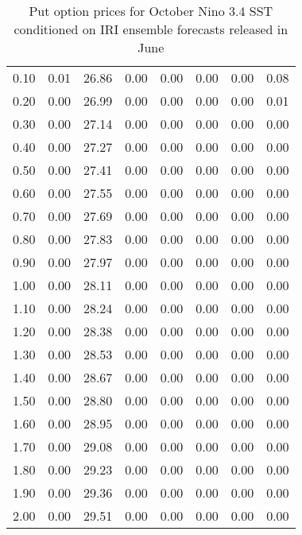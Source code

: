 \begin{table*}[ht]
\begin{tabular}{rrrrrrrr}
  0.10 & 0.01 & 26.86 & 0.00 & 0.00 & 0.00 & 0.00 & 0.08 \\ 
  0.20 & 0.00 & 26.99 & 0.00 & 0.00 & 0.00 & 0.00 & 0.01 \\ 
  0.30 & 0.00 & 27.14 & 0.00 & 0.00 & 0.00 & 0.00 & 0.00 \\ 
  0.40 & 0.00 & 27.27 & 0.00 & 0.00 & 0.00 & 0.00 & 0.00 \\ 
  0.50 & 0.00 & 27.41 & 0.00 & 0.00 & 0.00 & 0.00 & 0.00 \\ 
  0.60 & 0.00 & 27.55 & 0.00 & 0.00 & 0.00 & 0.00 & 0.00 \\ 
  0.70 & 0.00 & 27.69 & 0.00 & 0.00 & 0.00 & 0.00 & 0.00 \\ 
  0.80 & 0.00 & 27.83 & 0.00 & 0.00 & 0.00 & 0.00 & 0.00 \\ 
  0.90 & 0.00 & 27.97 & 0.00 & 0.00 & 0.00 & 0.00 & 0.00 \\ 
  1.00 & 0.00 & 28.11 & 0.00 & 0.00 & 0.00 & 0.00 & 0.00 \\ 
  1.10 & 0.00 & 28.24 & 0.00 & 0.00 & 0.00 & 0.00 & 0.00 \\ 
  1.20 & 0.00 & 28.38 & 0.00 & 0.00 & 0.00 & 0.00 & 0.00 \\ 
  1.30 & 0.00 & 28.53 & 0.00 & 0.00 & 0.00 & 0.00 & 0.00 \\ 
  1.40 & 0.00 & 28.67 & 0.00 & 0.00 & 0.00 & 0.00 & 0.00 \\ 
  1.50 & 0.00 & 28.80 & 0.00 & 0.00 & 0.00 & 0.00 & 0.00 \\ 
  1.60 & 0.00 & 28.95 & 0.00 & 0.00 & 0.00 & 0.00 & 0.00 \\ 
  1.70 & 0.00 & 29.08 & 0.00 & 0.00 & 0.00 & 0.00 & 0.00 \\ 
  1.80 & 0.00 & 29.23 & 0.00 & 0.00 & 0.00 & 0.00 & 0.00 \\ 
  1.90 & 0.00 & 29.36 & 0.00 & 0.00 & 0.00 & 0.00 & 0.00 \\ 
  2.00 & 0.00 & 29.51 & 0.00 & 0.00 & 0.00 & 0.00 & 0.00 \\ 
   \hline
\end{tabular}
\caption{Put option prices for October Nino 3.4 SST conditioned on IRI ensemble forecasts released in June} 
\end{table*}

